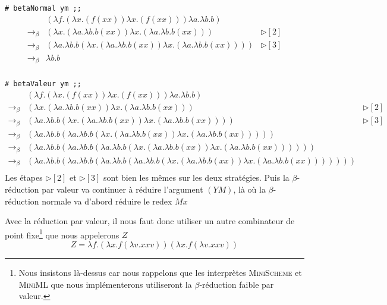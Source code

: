 \verb+# betaNormal ym ;;+
$$
\begin{array}{lll}
 & (\lambda f . (\lambda x . (f(xx))\lambda x . (f(xx)))\lambda a . \lambda b . b) &  \\
 \rightarrow _\beta & (\lambda x . (\lambda a . \lambda b . b(xx))\lambda x . (\lambda a . \lambda b . b(xx))) &\triangleright [2]  \\
 \rightarrow _\beta & (\lambda a . \lambda b . b(\lambda x . (\lambda a . \lambda b . b(xx))\lambda x . (\lambda a . \lambda b . b(xx))))  &\triangleright [3]  \\
 \rightarrow _\beta & \lambda b . b &  \\
\end{array}
$$

\verb+# betaValeur ym ;;+
$$
\begin{array}{lll}
 & (\lambda f . (\lambda x . (f(xx))\lambda x . (f(xx)))\lambda a . \lambda b . b)  &  \\
\rightarrow _\beta & (\lambda x . (\lambda a . \lambda b . b(xx))\lambda x . (\lambda a . \lambda b . b(xx))) & \triangleright [2]  \\
\rightarrow _\beta & (\lambda a . \lambda b . b(\lambda x . (\lambda a . \lambda b . b(xx))\lambda x . (\lambda a . \lambda b . b(xx)))) & \triangleright [3] \\
\rightarrow _\beta & (\lambda a . \lambda b . b(\lambda a . \lambda b . b(\lambda x . (\lambda a . \lambda b . b(xx))\lambda x . (\lambda a . \lambda b . b(xx)))))  & \\
\rightarrow _\beta & (\lambda a . \lambda b . b(\lambda a . \lambda b . b(\lambda a . \lambda b . b(\lambda x . (\lambda a . \lambda b . b(xx))\lambda x . (\lambda a . \lambda b . b(xx)))))) &  \\
\rightarrow _\beta & (\lambda a . \lambda b . b(\lambda a . \lambda b . b(\lambda a . \lambda b . b(\lambda a . \lambda b . b(\lambda x . (\lambda a . \lambda b . b(xx))\lambda x . (\lambda a . \lambda b . b(xx)))))))  & \\
\end{array}
$$
Les étapes  $\triangleright [2]$ et $\triangleright [3]$ sont bien les mêmes sur les deux stratégies. 
Puis la $\beta$-réduction par valeur va continuer à réduire l'argument
$(YM)$, là où la $\beta$-réduction normale va d'abord réduire le redex $Mx$

Avec la réduction par valeur, il nous faut donc utiliser un autre combinateur de point fixe\footnote{Nous insistons 
là-dessus car nous rappelons que les interprètes \textsc{MiniScheme} et \textsc{MiniML} que nous implémenterons utiliseront la $\beta$-réduction faible par valeur.}
 que nous appelerons $Z$ 
$$Z = \lambda f.(\lambda x.f(\lambda v.xxv))(\lambda x.f(\lambda v.xxv)) $$



